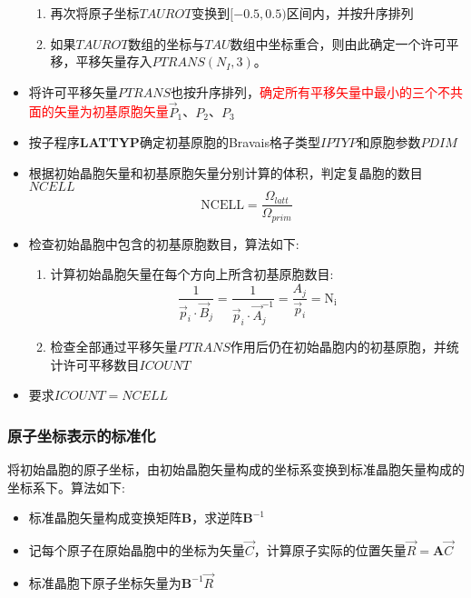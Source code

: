 \begin{itemize}
\begin{enumerate}
			\item 再次将原子坐标$\mathit{TAUROT}$变换到$[-0.5,0.5)$区间内，并按升序排列
			\item 如果$\mathit{TAUROT}$数组的坐标与$\mathit{TAU}$数组中坐标重合，则由此确定一个许可平移，平移矢量存入$\mathit{PTRANS}(N_I,3)$。
		\end{enumerate}
	\item 将许可平移矢量$\mathit{PTRANS}$也按升序排列，\textcolor{red}{确定所有平移矢量中最小的三个不共面的矢量为初基原胞矢量}$\vec P_1$、$P_2$、$P_3$
	\item 按子程序\textbf{LATTYP}确定初基原胞的\textrm{Bravais}格子类型$\mathit{IPTYP}$和原胞参数$\mathit{PDIM}$
        \item 根据初始晶胞矢量和初基原胞矢量分别计算的体积，判定复晶胞的数目$\mathit{NCELL}$
\begin{displaymath}
	\mathrm{NCELL}=\dfrac{\Omega_{latt}}{\Omega_{prim}}
\end{displaymath}
	\item 检查初始晶胞中包含的初基原胞数目，算法如下:~
		\begin{enumerate}
			\item 计算初始晶胞矢量在每个方向上所含初基原胞数目:
		\begin{displaymath}
			\dfrac1{\vec p_i\cdot\vec B_j}=\dfrac1{\vec p_i\cdot\vec A_j^{-1}}=\dfrac{A_j}{\vec p_i}=\mathrm{N_{i}}
		\end{displaymath}
	\item 检查全部通过平移矢量$\mathit{PTRANS}$作用后仍在初始晶胞内的初基原胞，并统计许可平移数目$\mathit{ICOUNT}$
		\end{enumerate}
	\item 要求$\mathit{ICOUNT}=\mathit{NCELL}$
\end{itemize}

\subsubsection{原子坐标表示的标准化}
将初始晶胞的原子坐标，由初始晶胞矢量构成的坐标系变换到标准晶胞矢量构成的坐标系下。算法如下:~
\begin{itemize}
	\item 标准晶胞矢量构成变换矩阵$\mathbf B$，求逆阵$\mathbf{B}^{-1}$
	\item 记每个原子在原始晶胞中的坐标为矢量$\vec C$，计算原子实际的位置矢量$\vec R=\mathbf{A}\vec C$
	\item 标准晶胞下原子坐标矢量为$\mathbf{B}^{-1}\vec R$
\end{itemize}


